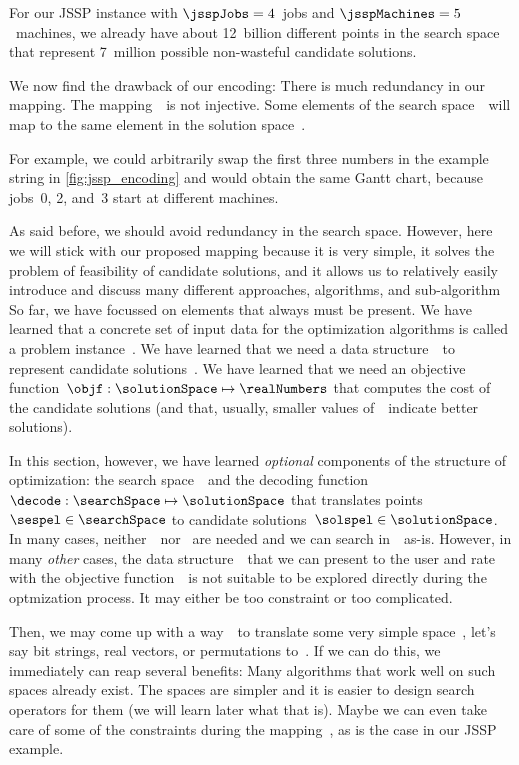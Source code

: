 For our  \gls{JSSP} instance with $\jsspJobs=4$~jobs and $\jsspMachines=5$~machines, we already have about 12~billion different points in the search space that represent 7~million possible non-wasteful candidate solutions.

We now find the drawback of our encoding:
There is much redundancy in our mapping.
The mapping~\decode\ is not injective.
Some elements of the search space~\searchSpace\ will map to the same element in the solution space~\solutionSpace.

For example, we could arbitrarily swap the first three numbers in the example string in \autoref{fig:jssp_encoding} and would obtain the same Gantt chart, because jobs~0, 2, and~3 start at different machines.

As said before, we should avoid redundancy in the search space.
However, here we will stick with our proposed mapping because it is very simple, it solves the problem of feasibility of candidate solutions, and it allows us to relatively easily introduce and discuss many different approaches, algorithms, and sub-algorithm%
\endhsection%
\endhsection%
%
%
So far, we have focussed on elements that always must be present.
We have learned that a concrete set of input data for the optimization algorithms is called a problem instance~\instance.
We have learned that we need a data structure~\solutionSpace\ to represent candidate solutions~\solspel.
We have learned that we need an objective function~$\objf:\solutionSpace\mapsto\realNumbers$ that computes the cost of the candidate solutions (and that, usually, smaller values of~\objf\ indicate better solutions).

In this section, however, we have learned \emph{optional} components of the structure of optimization: the search space~\searchSpace\ and the decoding function~$\decode:\searchSpace\mapsto\solutionSpace$ that translates points~$\sespel\in\searchSpace$ to candidate solutions~$\solspel\in\solutionSpace$.
In many cases, neither~\searchSpace\ nor \decode\ are needed and we can search in~\solutionSpace\ as-is.
However, in many \emph{other} cases, the data structure~\solutionSpace\ that we can present to the user and rate with the objective function~\objf\ is not suitable to be explored directly during the optmization process.
It may either be too constraint or too complicated.

Then, we may come up with a way~\decode\ to translate some very simple space~\searchSpace, let's say bit strings, real vectors, or permutations to~\solutionSpace.
If we can do this, we immediately can reap several benefits:
Many algorithms that work well on such spaces already exist.
The spaces are simpler and it is easier to design search operators for them (we will learn later what that is).
Maybe we can even take care of some of the constraints during the mapping~\decode, as is the case in our \gls{JSSP} example.


